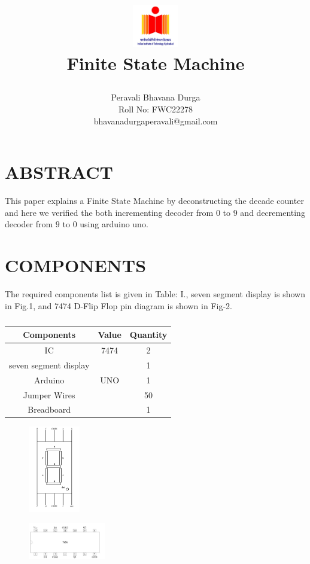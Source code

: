 \documentclass[conference]{IEEEtran}
\title{
\vspace{1cm} 

{\includegraphics[width=0.15\textwidth]{iith.jpg} \\ Finite State Machine} }
\author{Peravali Bhavana Durga \\ Roll No: FWC22278 \\ bhavanadurgaperavali@gmail.com}
\begin{document}
\maketitle
 \section {ABSTRACT}
 This paper explains a Finite State Machine by deconstructing the decade counter and here we verified the both incrementing decoder from $0$ to $9$ and decrementing decoder from $9$ to $0$ using arduino uno.

\section{COMPONENTS}
The required components list is given in Table: I., seven segment display is shown in Fig.1, and 7474 D-Flip Flop pin diagram is shown in Fig-2.
\vspace{0.3cm}
 \begin{table} [htbp]
\centering
\begin{tabular}{| c | c | c |} \hline
Components & Value & Quantity \\\hline
IC & 7474 & 2 \\ \hline
seven segment display & & 1\\ \hline
Arduino & UNO & 1 \\ \hline
Jumper Wires &  & 50 \\ \hline
Breadboard & & 1 \\
\hline
\end{tabular}
\vspace{0.3cm}
\caption{\label{tab:widgets}}
\end{table}

\begin{figure}[h]
\centering
\includegraphics[width=0.2\textwidth]{seg.jpg}
\caption{\label{fig-1:Gates}}
\end{figure}

\begin{figure}[h]
\centering
\includegraphics[width=0.3\textwidth]{7474.jpg}
\caption{\label{fig-2:Gates}}
\end{figure}
\end{document}
